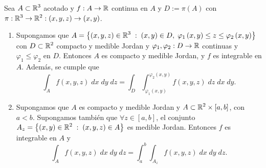 \begin{observation}
	Sea $\displaystyle A \subset \mathbb{R}^{3} $ acotado y $\displaystyle f : A \to \mathbb{R} $ continua en $\displaystyle A $ y $\displaystyle D := \pi\left(A\right) $ con $\displaystyle \pi: \mathbb{R}^{3}\to \mathbb{R}^{2} : \left(x,y,z\right)\to \left(x,y\right) $.  
	\begin{enumerate}
		\item Supongamos que $\displaystyle A = \left\{ \left(x,y,z\right)\in \mathbb{R}^{3} \; : \; \left(x,y\right)\in D, \; \varphi_{1}\left(x,y\right)\leq z \leq \varphi_{2}\left(x,y\right)\right\}  $ con $\displaystyle D \subset \mathbb{R}^{2} $ compacto y medible Jordan y $\displaystyle \varphi_{1}, \varphi_{2} : D \to \mathbb{R} $ continuas y $\displaystyle \varphi_{1}\leq \varphi_{2} $ en $\displaystyle D $. Entonces $\displaystyle A $ es compacto y medible Jordan, y $\displaystyle f $ es integrable en $\displaystyle A $. Además, se cumple que 
			\[\int _{A}f\left(x,y,z\right) \; dx \; dy \; dz = \int _{D}\int^{\varphi_{2}\left(x,y\right)}_{\varphi_{1}\left(x,y\right)} f\left(x,y,z\right) \; dz \; dx \; dy .\]
		\item Supongamos que $\displaystyle A $ es compacto y medible Jordan y $\displaystyle A \subset \mathbb{R}^{2} \times \left[a,b\right]  $, con $\displaystyle a < b $. Supongamos también que $\displaystyle \forall z \in \left[a,b\right]  $, el conjunto $\displaystyle A _{z} = \left\{ \left(x,y\right) \in \mathbb{R}^{2} \; : \; \left(x,y,z\right)\in A\right\}  $ es medible Jordan. Entonces $\displaystyle f $ es integrable en $\displaystyle A $ y 
			\[\int _{A}f\left(x,y,z\right) \; dx \; dy \; dz = \int^{b}_{a} \int _{A_{z}}f\left(x,y,z\right) \; dx \; dy \; dz .\]
	\end{enumerate}
\end{observation}
